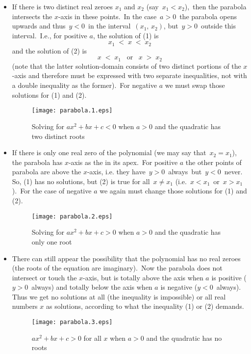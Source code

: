 \documentclass[12pt]{article}
\theoremstyle{definition}
\begin{document}
\begin{itemize}
 \item If there is two distinct real zeroes $x_1$ and $x_2$ (say\, $x_1 < x_2$),\, then the parabola intersects the $x$-axis in these points.\, In the case\, $a > 0$\, the parabola opens upwards and thus\, $y < 0$\, in the interval\, $(x_1,\,x_2)$, but\, $y > 0$\, outside this interval.\, I.e., for positive $a$,  the solution of (1) is
      $$x_1 \;<\; x \;<\; x_2$$
and the solution of (2) is
      $$x \;<\; x_1\,\,\,\mbox{ or }\,\,\,x \;>\; x_2$$ 
(note that the latter solution-domain consists of two distinct portions of the $x$-axis and therefore must be expressed with two separate inequalities, not with a double inequality as the former).\, For negative $a$ we must swap those solutions for (1) and (2).

\begin{figure}[!htb]
\begin{center}
\texttt{[image: parabola.1.eps]}
\end{center}
\caption{Solving for $ax^2\!+\!bx\!+\!c < 0$ when $a > 0$ and the quadratic has two distinct roots}
\end{figure}

 \item If there is only one real zero of the polynomial (we may say that\, $x_2 = x_1$), the parabola has $x$-axis as the  in its apex.\, For positive $a$ the other points of parabola are above the $x$-axis, i.e. they have\, $y > 0$\, always\, but\, $y < 0$\, never.\, So, (1) has no solutions, but (2) is true for all\, $x \neq x_1$ (i.e.\, $x < x_1$\, or\, $x > x_1$).\, For the case of negative $a$ we again must change those solutions for (1) and (2).

\begin{figure}[!htb]
\begin{center}
\texttt{[image: parabola.2.eps]}
\end{center}
\caption{Solving for $ax^2\!+\!bx\!+\!c > 0$ when $a > 0$ and the quadratic has only one root}
\end{figure}

 \item There can still appear the possibility that the polynomial has no real zeroes (the roots of the equation are imaginary).\, Now the parabola does not intersect or touch the $x$-axis, but is totally above the axis when $a$ is positive ($y > 0$\, always) and totally below the axis when $a$ is negative 
($y < 0$\, always).\, Thus we get no solutions at all (the inequality is impossible) or all real numbers $x$ as solutions, according to what the inequality (1) or (2) demands.

\begin{figure}[!htb]
\begin{center}
\texttt{[image: parabola.3.eps]}
\end{center}
\caption{$ax^2\!+\!bx\!+\!c > 0$ for all $x$ when $a > 0$ and the quadratic has no roots}
\end{figure}

\end{itemize}
\end{document}
